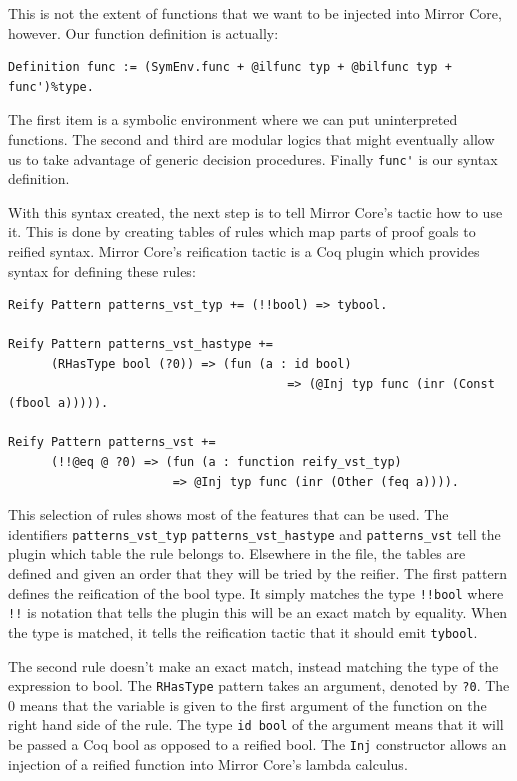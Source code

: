 \documentclass{puthesis}
\begin{document}
This is not the extent of functions that we want to be injected into
Mirror Core, however. Our function definition is actually:

\begin{lstlisting}
Definition func := (SymEnv.func + @ilfunc typ + @bilfunc typ + func')%type.
\end{lstlisting}

The first item is a symbolic environment where we can put
uninterpreted functions. The second and third are modular logics
that might eventually allow us to take advantage of generic decision
procedures. Finally \lstinline|func'| is our syntax definition.

With this syntax created, the next step is to tell Mirror Core's
tactic how to use it. This is done by creating tables of rules which
map parts of proof goals to reified syntax. Mirror Core's reification
tactic is a Coq plugin which provides syntax for defining these rules:

\begin{lstlisting}
Reify Pattern patterns_vst_typ += (!!bool) => tybool.

Reify Pattern patterns_vst_hastype += 
      (RHasType bool (?0)) => (fun (a : id bool) 
                                       => (@Inj typ func (inr (Const (fbool a))))).

Reify Pattern patterns_vst += 
      (!!@eq @ ?0) => (fun (a : function reify_vst_typ) 
                       => @Inj typ func (inr (Other (feq a)))).
\end{lstlisting}

This selection of rules shows most of the features that can be
used. The identifiers \lstinline|patterns_vst_typ| \lstinline|patterns_vst_hastype| and
\lstinline|patterns_vst| tell the plugin which table the rule belongs
to. Elsewhere in the file, the tables are defined and given an order
that they will be tried by the reifier. The first pattern defines the
reification of the bool type. It simply matches the type
\lstinline|!!bool| where \lstinline|!!| is notation that tells the
plugin this will be an exact match by equality. When the type is
matched, it tells the reification tactic that it should emit
\lstinline|tybool|.

The second rule doesn't make an exact match, instead matching the type
of the expression to bool. The \lstinline|RHasType| pattern takes an
argument, denoted by \lstinline|?0|. The 0 means that the variable is
given to the first argument of the function on the right hand side of
the rule. The type \lstinline|id bool| of the argument means that it
will be passed a Coq bool as opposed to a reified bool. The
\lstinline|Inj| constructor allows an injection of a reified function
into Mirror Core's lambda calculus. 
\end{document}
